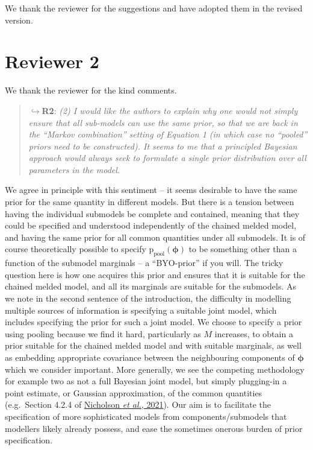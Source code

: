 \documentclass[
  10pt,
  a4paper,
]{article}
\newcommand{\pd}{\text{p}}
\newcommand{\Nm}{M}
\begin{document}
We thank the reviewer for the suggestions and have adopted them in the
revised version.

\hypertarget{reviewer-2}{%
\section*{Reviewer 2}\label{reviewer-2}}

We thank the reviewer for the kind comments.

\begin{quote}
\(\hookrightarrow\)\textbf{R2}: \emph{(2) I would like the authors to
explain why one would not simply ensure that all sub-models can use the
same prior, so that we are back in the ``Markov combination'' setting of
Equation 1 (in which case no ``pooled'' priors need to be constructed).
It seems to me that a principled Bayesian approach would always seek to
formulate a single prior distribution over all parameters in the model.}
\end{quote}

We agree in principle with this sentiment -- it seems desirable to have
the same prior for the same quantity in different models. But there is a
tension between having the individual submodels be complete and
contained, meaning that they could be specified and understood
independently of the chained melded model, and having the same prior for
all common quantities under all submodels. It is of course theoretically
possible to specify \(\pd_{\text{pool}}(\boldsymbol{\phi})\) to be
something other than a function of the submodel marginals -- a
``BYO-prior'' if you will. The tricky question here is how one acquires
this prior and ensures that it is suitable for the chained melded model,
and all its marginals are suitable for the submodels. As we note in the
second sentence of the introduction, the difficulty in modelling
multiple sources of information is specifying a suitable joint model,
which includes specifying the prior for such a joint model. We choose to
specify a prior using pooling because we find it hard, particularly as
\(\Nm\) increases, to obtain a prior suitable for the chained melded
model and with suitable marginals, as well as embedding appropriate
covariance between the neighbouring components of \(\boldsymbol{\phi}\)
which we consider important. More generally, we see the competing
methodology for example two as not a full Bayesian joint model, but
simply plugging-in a point estimate, or Gaussian approximation, of the
common quantities (e.g.~Section 4.2.4 of
\protect\hyperlink{ref-nicholson_interoperability_2021}{Nicholson
\emph{et al.}, 2021}). Our aim is to facilitate the specification of
more sophisticated models from components/submodels that modellers
likely already possess, and ease the sometimes onerous burden of prior
specification.
\end{document}
